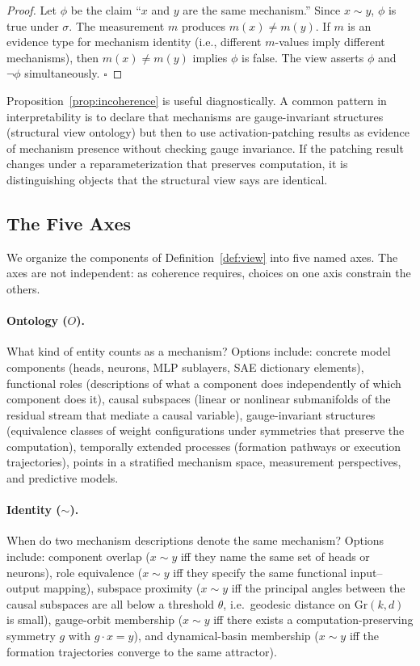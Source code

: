 \documentclass[11pt]{article}
\theoremstyle{remark}
\newcommand{\Gr}{\mathrm{Gr}}
\newcommand{\view}{\sigma}
\begin{document}
\begin{proof}
Let $\phi$ be the claim ``$x$ and $y$ are the same mechanism.''  Since
$x \sim y$, $\phi$ is true under $\view$.  The measurement $m$ produces
$m(x) \neq m(y)$.  If $m$ is an evidence type for mechanism identity
(i.e., different $m$-values imply different mechanisms), then $m(x) \neq
m(y)$ implies $\phi$ is false.  The view asserts $\phi$ and $\neg \phi$
simultaneously.  \hfill $\square$
\end{proof}

Proposition~\ref{prop:incoherence} is useful diagnostically.  A common
pattern in interpretability is to declare that mechanisms are
gauge-invariant structures (structural view ontology) but then to use
activation-patching results as evidence of mechanism presence without
checking gauge invariance.  If the patching result changes under a
reparameterization that preserves computation, it is distinguishing
objects that the structural view says are identical.

\subsection{The Five Axes}\label{sec:axes}

We organize the components of Definition~\ref{def:view} into five named
axes.  The axes are not independent: as coherence requires, choices on
one axis constrain the others.

\paragraph{Ontology ($O$).}
What kind of entity counts as a mechanism?  Options include: concrete
model components (heads, neurons, MLP sublayers, SAE dictionary
elements), functional roles (descriptions of what a component does
independently of which component does it), causal subspaces (linear or
nonlinear submanifolds of the residual stream that mediate a causal
variable), gauge-invariant structures (equivalence classes of weight
configurations under symmetries that preserve the computation),
temporally extended processes (formation pathways or execution
trajectories), points in a stratified mechanism space, measurement
perspectives, and predictive models.

\paragraph{Identity ($\sim$).}
When do two mechanism descriptions denote the same mechanism?  Options
include: component overlap ($x \sim y$ iff they name the same set of
heads or neurons), role equivalence ($x \sim y$ iff they specify the
same functional input--output mapping), subspace proximity ($x \sim y$
iff the principal angles between the causal subspaces are all below a
threshold $\theta$, i.e.\ geodesic distance on $\Gr(k,d)$ is small),
gauge-orbit membership ($x \sim y$ iff there exists a computation-preserving
symmetry $g$ with $g \cdot x = y$), and dynamical-basin membership
($x \sim y$ iff the formation trajectories converge to the same
attractor).
\end{document}
